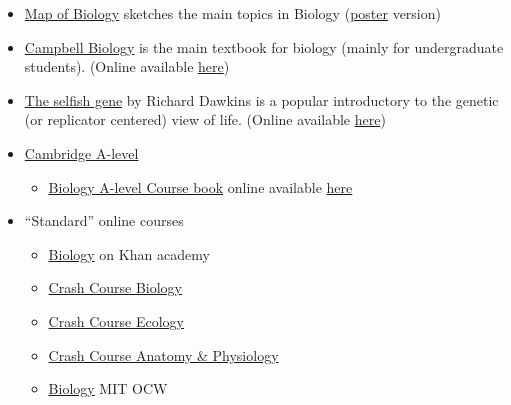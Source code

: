 \documentclass{article}
\begin{document}
\begin{itemize}
    \item \href{https://www.youtube.com/watch?v=wENhHnJI1ys}{Map of Biology} sketches the main topics in Biology (\href{https://mymodernmet.com/wp/wp-content/uploads/2018/03/infographic-map-biology.png}{poster} version)
    \item \href{https://www.goodreads.com/book/show/145806.Biology}{Campbell Biology} is the main textbook for biology (mainly for undergraduate students). (Online available \href{https://archive.org/details/JaneB.Reece--CampbellBiology9thEd./page/n971/mode/2up}{here})
    \item \href{https://www.goodreads.com/lt/book/show/11991323-the-selfish-gene}{The selfish gene} by  Richard Dawkins is a popular introductory to the genetic (or replicator centered) view of life. (Online available \href{https://archive.org/stream/pdfy-RHEZa8riPwBuUyrV#mode/2up Selfish Gene}{here})
    \item \href{https://www.cambridgeinternational.org/programmes-and-qualifications/cambridge-international-as-and-a-level-biology-9700/}{Cambridge A-level}
    \begin{itemize}
        \item \href{https://www.goodreads.com/book/show/34108108-cambridge-international-as-and-a-level-biology-workbook-with-cd-rom}{Biology A-level Course book} online available \href{https://web.archive.org/web/20201111165810/https://www.gceguide.xyz/files/e-books/a-level/Cambridge\%20International\%20AS\%20and\%20A\%20Level\%20Biology\%20Coursebook.pdf}{here}
    \end{itemize}
    
    \item ``Standard'' online courses
    \begin{itemize}
    \item \href{https://www.khanacademy.org/science/biology}{Biology} on Khan academy
    \item \href{https://www.youtube.com/playlist?list=PL3EED4C1D684D3ADF}{Crash Course Biology}
    \item \href{https://www.youtube.com/playlist?list=PL8dPuuaLjXtNdTKZkV_GiIYXpV9w4WxbX}{Crash Course Ecology}
    \item \href{https://www.youtube.com/playlist?list=PL8dPuuaLjXtOAKed_MxxWBNaPno5h3Zs8}{Crash Course Anatomy \& Physiology}
    
    \item \href{https://ocw.mit.edu/courses/biology/}{Biology} MIT OCW
    \end{itemize}
    

\end{itemize}
\end{document}
